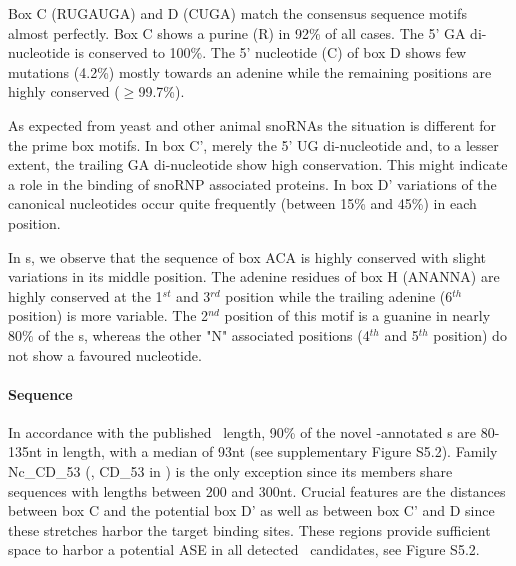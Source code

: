 Box C (RUGAUGA) and D (CUGA) match the consensus sequence motifs
almost perfectly. Box C shows a purine (R) in 92\% of all cases.  The
5' GA di-nucleotide is conserved to 100\%.  The 5' nucleotide (C) of
box D shows few mutations (4.2\%) mostly towards an adenine while the
remaining positions are highly conserved ($\ge$99.7\%).

As expected from yeast and other animal snoRNAs the situation is
different for the prime box motifs.  In box C', merely the 5' UG
di-nucleotide and, to a lesser extent, the trailing GA di-nucleotide
show high conservation.  This might indicate a role in the binding of
snoRNP associated proteins.  In box D' variations of the canonical
nucleotides occur quite frequently (between 15\% and 45\%) in each
position.

In \haca s, we observe that the sequence of box ACA is highly
conserved with slight variations in its middle position. The adenine
residues of box H (ANANNA) are highly conserved at the 1$^{st}$ and
3$^{rd}$ position while the trailing adenine (6$^{th}$ position) is
more variable. The 2$^{nd}$ position of this motif is a guanine in
nearly 80\% of the \haca s, whereas the other "N" associated positions
(4$^{th}$ and 5$^{th}$ position) do not show a favoured nucleotide.

\paragraph{\textbf{Sequence}} In accordance with the published \cd\
length, 90\% of the novel \snostrip-annotated \sno s are 80-135nt in
length, with a median of 93nt (see supplementary Figure S5.2).  Family Nc\_CD\_53
(\ncr, CD\_53 in \snostrip) is the only exception since its members
share sequences with lengths between 200 and 300nt.  Crucial features
are the distances between box C and the potential box D' as well as
between box C' and D since these stretches harbor the target binding
sites. These regions provide sufficient space to harbor a potential ASE in all detected \sno\ candidates, see Figure S5.2.

